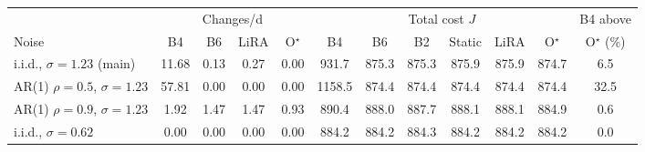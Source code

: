 \begin{tabular}{@{}lccccccccccc@{}}
\toprule
 & \multicolumn{4}{c}{Changes/d} & \multicolumn{6}{c}{Total cost $J$} & B4 above \\
\cmidrule(lr){2-5}\cmidrule(lr){6-11}
Noise & B4 & B6 & LiRA & O$^\star$ & B4 & B6 & B2 & Static & LiRA & O$^\star$ & O$^\star$ (\%) \\
\midrule
i.i.d., $\sigma=1.23$ (main) & 11.68 & 0.13 & 0.27 & 0.00 & 931.7 & 875.3 & 875.3 & 875.9 & 875.9 & 874.7 & 6.5 \\
AR(1) $\rho=0.5$, $\sigma=1.23$ & 57.81 & 0.00 & 0.00 & 0.00 & 1158.5 & 874.4 & 874.4 & 874.4 & 874.4 & 874.4 & 32.5 \\
AR(1) $\rho=0.9$, $\sigma=1.23$ & 1.92 & 1.47 & 1.47 & 0.93 & 890.4 & 888.0 & 887.7 & 888.1 & 888.1 & 884.9 & 0.6 \\
i.i.d., $\sigma=0.62$ & 0.00 & 0.00 & 0.00 & 0.00 & 884.2 & 884.2 & 884.3 & 884.2 & 884.2 & 884.2 & 0.0 \\
\bottomrule
\end{tabular}
